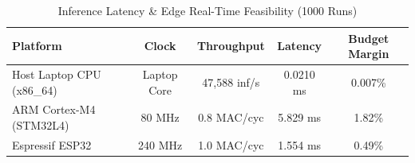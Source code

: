 \begin{table}[t]
\centering
\caption{Inference Latency & Edge Real-Time Feasibility (1000 Runs)}
\label{tab:latency}
\small
\begin{tabular}{lcccc}
\toprule
\textbf{Platform} & \textbf{Clock} & \textbf{Throughput} & \textbf{Latency} & \textbf{Budget Margin} \\
\midrule
Host Laptop CPU (x86\_64) & Laptop Core & 47,588 inf/s & 0.0210 ms & 0.007\% \\
ARM Cortex-M4 (STM32L4) & 80 MHz & 0.8 MAC/cyc & 5.829 ms & 1.82\% \\
Espressif ESP32 & 240 MHz & 1.0 MAC/cyc & 1.554 ms & 0.49\% \\
\bottomrule
\end{tabular}
\end{table}